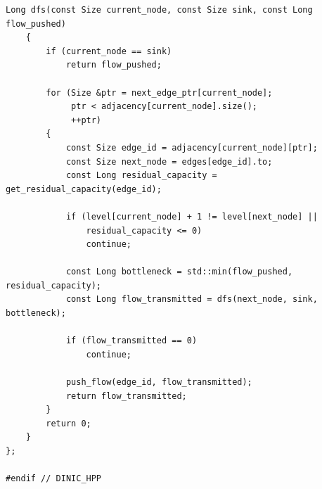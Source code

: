 \begin{lstlisting}[caption={Implementação em C++ da classe \lstinline{Dinic}, estruturada com Digrafo de Níveis e otimização de ponteiros mortos no cálculo do fluxo bloqueador.}, label={lst:dinic}]
	Long dfs(const Size current_node, const Size sink, const Long flow_pushed)
	{
		if (current_node == sink)
			return flow_pushed;

		for (Size &ptr = next_edge_ptr[current_node];
		     ptr < adjacency[current_node].size();
		     ++ptr)
		{
			const Size edge_id = adjacency[current_node][ptr];
			const Size next_node = edges[edge_id].to;
			const Long residual_capacity = get_residual_capacity(edge_id);

			if (level[current_node] + 1 != level[next_node] ||
			    residual_capacity <= 0)
				continue;

			const Long bottleneck = std::min(flow_pushed, residual_capacity);
			const Long flow_transmitted = dfs(next_node, sink, bottleneck);

			if (flow_transmitted == 0)
				continue;

			push_flow(edge_id, flow_transmitted);
			return flow_transmitted;
		}
		return 0;
	}
};

#endif // DINIC_HPP
\end{lstlisting}
